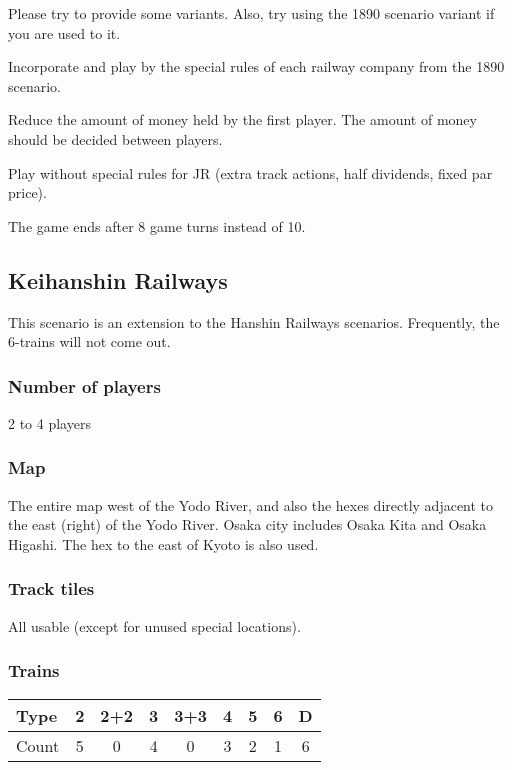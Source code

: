 \begin{multicols}{2}
Please try to provide some variants. Also, try using the 1890 scenario
variant if you are used to it.

Incorporate and play by the special rules of each railway company from the
1890 scenario.

Reduce the amount of money held by the first player. The amount of
money should be decided between players.

Play without special rules for JR (extra track actions, half
dividends, fixed par price).

The game ends after 8 game turns instead of 10.

\newpage
\subsection{Keihanshin Railways}

This scenario is an extension to the Hanshin Railways
scenarios. Frequently, the 6-trains will not come out.

\subsubsection{Number of players}

2 to 4 players

\subsubsection{Map}

The entire map west of the Yodo River, and also the hexes directly
adjacent to the east (right) of the Yodo River. Osaka city includes
Osaka Kita and Osaka Higashi. The hex to the east of Kyoto is also
used.

\subsubsection{Track tiles}

All usable (except for unused special locations).

\subsubsection{Trains}
\begin{tabular}{l|cccccccc}
Type & 2 & 2+2 & 3 & 3+3 & 4 & 5 & 6 & D \\ \hline
Count & 5 & 0 & 4 & 0 & 3 & 2 & 1 & 6
\end{tabular}


\end{multicols}
